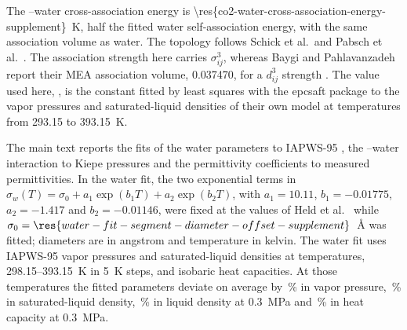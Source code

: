 \documentclass[a4paper,11pt]{article}
\begin{document}





The \COtwo--water cross-association energy is \SI{\res{co2-water-cross-association-energy-supplement}}{\kelvin}, half the fitted water self-association energy, with the same association volume as water.
The topology follows Schick et al.\ and Pabsch et al.\ \cite{Schick2023,Pabsch2020}.
The association strength here carries $\sigma_{ij}^3$, whereas Baygi and Pahlavanzadeh report their MEA association volume, 0.037470, for a $d_{ij}^3$ strength \cite{Baygi2015}.
The value used here, , is the constant fitted by least squares with the epcsaft package to the vapor pressures and saturated-liquid densities of their own model at  temperatures from 293.15 to \SI{393.15}{\kelvin}.

The main text reports the fits of the  water parameters to IAPWS-95 \cite{internationalassociationforthepropertiesofwaterandsteamRevisedReleaseIAPWS2018}, the \COtwo--water interaction to Kiepe pressures \cite{kiepeExperimentalDeterminationPrediction2002} and the \MEA permittivity coefficients to measured permittivities.
In the water fit, the two exponential terms in $\sigma_w(T)=\sigma_0+a_1\exp(b_1T)+a_2\exp(b_2T)$, with $a_1=10.11$, $b_1=-0.01775$, $a_2=-1.417$ and $b_2=-0.01146$, were fixed at the values of Held et al.\ \cite{Held2008} while $\sigma_0=\res{water-fit-segment-diameter-offset-supplement}$~\si{\angstrom} was fitted; diameters are in angstrom and temperature in kelvin.
The water fit uses IAPWS-95 vapor pressures and saturated-liquid densities at  temperatures, 298.15--\SI{393.15}{\kelvin} in \SI{5}{\kelvin} steps, and  isobaric heat capacities.
At those  temperatures the fitted parameters deviate on average by \,\% in vapor pressure, \,\% in saturated-liquid density, \,\% in liquid density at \SI{0.3}{\mega\pascal} and \,\% in heat capacity at \SI{0.3}{\mega\pascal}.
\end{document}

